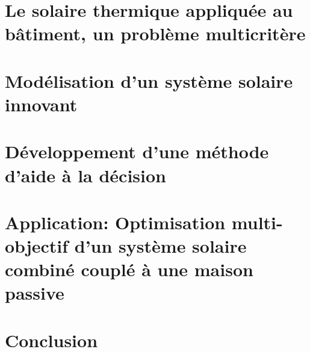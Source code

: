 \chapter{Le solaire thermique appliquée au bâtiment, un problème multicritère}
% 

\chapter{Modélisation d’un système solaire innovant}


\chapter{Développement d’une méthode d’aide à la décision}
% 

\chapter{Application: Optimisation multi-objectif d’un système solaire combiné couplé à une maison passive}
% 

\chapter*{Conclusion}
% 


\newpage
\addappheadtotoc
\appendix
\appendixpage
\chapter{}
% 


\newpage
\printbibliography[title={Bibliographie}]







